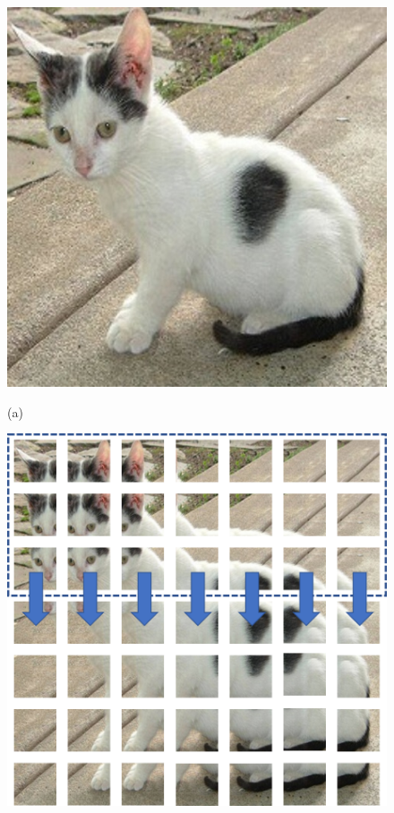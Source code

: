 \begin{figure}
	\begin{minipage}[b]{.48\linewidth}
		\centering
		\centerline{\includegraphics[width=\textwidth]{images/cat.jpg}}
		\centerline{(a)}\medskip
	\end{minipage}
	\hfill
	\begin{minipage}[b]{0.48\linewidth}
		\centering
		\centerline{\includegraphics[width=\textwidth]{images/cat_grid_v2.png}}

\end{minipage}
\end{figure}
